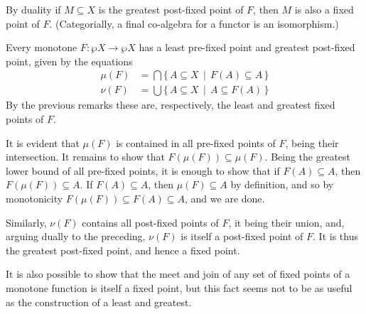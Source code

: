 \documentclass[11pt,twoside]{article}
\begin{document}
By duality if $M\subseteq X$ is the greatest post-fixed point of $F$, then $M$ is also a
fixed point of $F$. (Categorially, a final co-algebra for a functor is an
isomorphism.)

Every monotone $F:\wp{X}\to\wp{X}$ has a least pre-fixed point and greatest post-fixed
point, given by the equations
\begin{align*}
  \mu(F) & = \bigcap\{\,A\subseteq X\,\mid\, F(A)\subseteq A\,\} \\
  \nu(F) & = \bigcup\{\,A\subseteq X\,\mid\,A\subseteq F(A)\,\}
\end{align*}
By the previous remarks these are, respectively, the least and greatest fixed
points of $F$.

It is evident that $\mu(F)$ is contained in all pre-fixed points of $F$, being
their intersection.  It remains to show that $F(\mu(F))\subseteq \mu(F)$.  Being the
greatest lower bound of all pre-fixed points, it is enough to show that if
$F(A)\subseteq A$, then $F(\mu(F))\subseteq A$.  If $F(A)\subseteq A$, then $\mu(F)\subseteq A$ by definition, and
so by monotonicity $F(\mu(F))\subseteq F(A)\subseteq A$, and we are done.

Similarly, $\nu(F)$ contains all post-fixed points of $F$, it being their union,
and, arguing dually to the preceding, $\nu(F)$ is itself a post-fixed point of
$F$.  It is thus the greatest post-fixed point, and hence a fixed point.

It is also possible to show that the meet and join of any set of fixed points of
a monotone function is itself a fixed point, but this fact seems not to be as
useful as the construction of a least and greatest.
\end{document}

